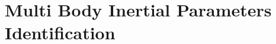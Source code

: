 \chapter{Multi Body Inertial Parameters Identification}
\label{ch:inertialParametersMultiBody}

\graphicspath{{./Chapter70MultiBodyInertialParameters/}}




